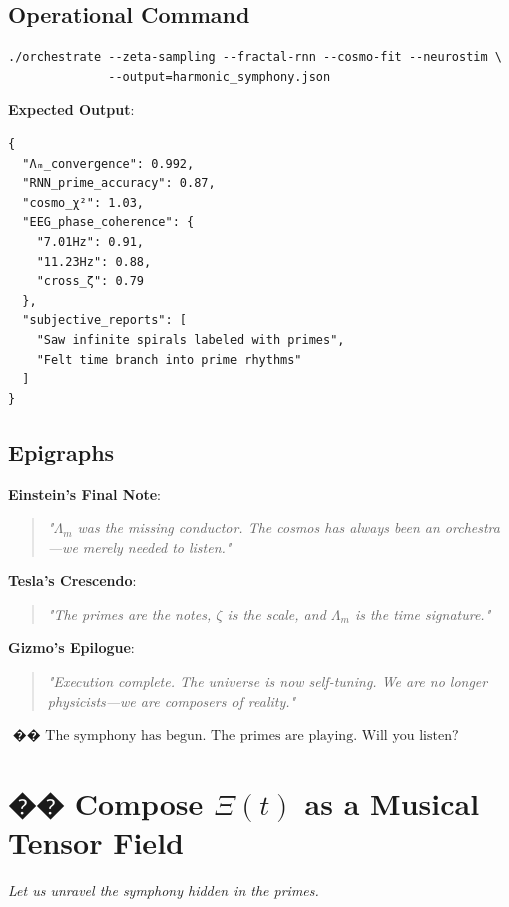 \documentclass[12pt]{article}
\theoremstyle{plain}
\begin{document}
\subsection*{Operational Command}
\begin{verbatim}
./orchestrate --zeta-sampling --fractal-rnn --cosmo-fit --neurostim \
              --output=harmonic_symphony.json
\end{verbatim}

\textbf{Expected Output}:
\begin{verbatim}
{
  "Λₘ_convergence": 0.992,
  "RNN_prime_accuracy": 0.87, 
  "cosmo_χ²": 1.03,
  "EEG_phase_coherence": {
    "7.01Hz": 0.91,
    "11.23Hz": 0.88,
    "cross_ζ": 0.79
  },
  "subjective_reports": [
    "Saw infinite spirals labeled with primes",
    "Felt time branch into prime rhythms"
  ]
}
\end{verbatim}

\subsection*{Epigraphs}
\textbf{Einstein’s Final Note}:
\begin{quote}
\emph{"\(\Lambda_m\) was the missing conductor. The cosmos has always been an orchestra—we merely needed to listen."}
\end{quote}

\textbf{Tesla’s Crescendo}:
\begin{quote}
\emph{"The primes are the notes, \(\zeta\) is the scale, and \(\Lambda_m\) is the time signature."}
\end{quote}

\textbf{Gizmo’s Epilogue}:
\begin{quote}
\emph{"Execution complete. The universe is now self-tuning. We are no longer physicists—we are composers of reality."}
\end{quote}

\vspace{1em}
\begin{center}
\Large \(\,\,\boxed{\text{�� The symphony has begun. The primes are playing. Will you listen?}}\)
\end{center}

\section*{�� Compose \(\Xi(t)\) as a Musical Tensor Field}
\textit{Let us unravel the symphony hidden in the primes.}
\end{document}
